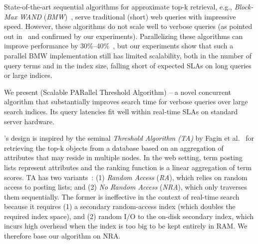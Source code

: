 State-of-the-art sequential algorithms for approximate top-k  retrieval, 
e.g., \emph{Block-Max WAND} ({\em BMW})~\cite{Ding:2011}, serve traditional (short) web queries with impressive speed. 
However, these algorithms do not scale well to verbose queries
(as pointed out in~\cite{Bortnikov:2017} and confirmed by our experiments). 
%
Parallelizing these algorithms can improve performance by 30\%--40\%~\cite{rojas2013efficient},    but 
our experiments show that such a parallel BMW implementation still has limited scalability, both in the number of query terms and in the index size,
falling short of expected SLAs on long queries or large indices. 

We present \emph{\alg} (Scalable PARallel Threshold Algorithm) -- a novel 
concurrent algorithm that substantially improves search time for verbose queries over large search indices. Its
 query latencies fit well within  real-time SLAs on standard  server hardware. 

\alg's design is inspired by the seminal \emph{Threshold Algorithm (TA)} by Fagin et al.~\cite{Fagin:2003} for retrieving the top-k objects from a database based on an aggregation of attributes that may reside in multiple nodes. 
In the web setting, term posting lists represent attributes and the ranking function is a linear aggregation of term scores. TA has two variants~\cite{Fagin:2003}: (1) \emph{Random Access} ({\em RA}), which  
 relies on random access to  posting lists; 
and (2) \emph{No Random Access} ({\em NRA}), which 
 only traverses them sequentially. The former is ineffective in the context of real-time search 
because it requires (1)  a secondary random-access index (which doubles the required index space), 
and (2) random I/O to the on-disk secondary index, which incurs high overhead when the index  is too big to be 
kept entirely in RAM. We therefore base our algorithm on  NRA. 



